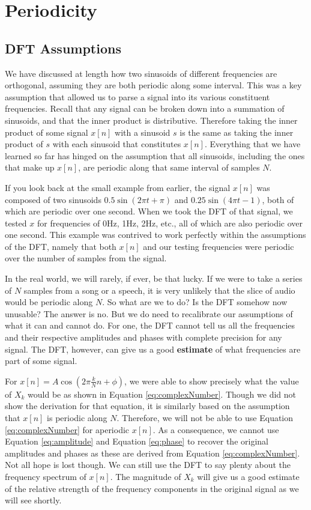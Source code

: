\section*{Periodicity}

\subsection*{DFT Assumptions}

We have discussed at length how two sinusoids of different frequencies are orthogonal, assuming they
are both periodic along some interval.  This was a key assumption that allowed us to parse a signal into 
its various constituent frequencies.  Recall that any signal can be broken down into a summation of sinusoids,
and that the inner product is distributive.  
Therefore taking the inner product of some signal $x[n]$ with
a sinusoid $s$ is the same as taking the inner product of $s$ with each sinusoid that
constitutes $x[n]$.  Everything that we have learned so far has hinged on the assumption that all sinusoids, 
including the ones that make up $x[n]$, are periodic along that same interval of samples $N$.  

If you look back
at the small example from earlier, the signal $x[n]$ was composed of two sinusoids $0.5\sin(2\pi t + \pi)$
and $0.25\sin(4\pi t - 1)$, both of which are periodic over one second.  When we took the DFT of that signal,
we tested $x$ for frequencies of 0Hz, 1Hz, 2Hz, etc., all of which are also periodic over one second.  This
example was contrived to work perfectly within the assumptions of the DFT, namely that both $x[n]$ and
our testing frequencies were periodic over the number of samples from the signal.  

In the real world, we will rarely, if ever, be that lucky.  If we were to take a series of $N$ samples from a song
or a speech, it is very unlikely that the slice of audio would be periodic along $N$.  So what are we to do?  Is the
DFT somehow now unusable?  The answer is no.  But we do need to recalibrate our assumptions of what
it can and cannot do.  For one, the DFT cannot tell us all the frequencies
and their respective amplitudes and phases with complete precision for any signal.  
The DFT, however, can give us a good \textbf{estimate} of what frequencies are part of some signal.

For $x[n] = A\cos(2 \pi \frac{k}{N} n + \phi)$, we were able to show precisely what the value of
$X_k$ would be as shown in Equation \ref{eq:complexNumber}.  Though we did not show the derivation for 
that equation, it is similarly
based on the assumption that $x[n]$ is periodic along $N$.  Therefore,
we will not be able to use Equation \ref{eq:complexNumber} for aperiodic $x[n]$.  As a consequence, we 
cannot use Equation \ref{eq:amplitude} and 
Equation \ref{eq:phase} to recover the original amplitudes and phases
 as these are derived from Equation \ref{eq:complexNumber}.  Not all hope is lost
though.  We can still use the DFT to say plenty about the frequency spectrum of $x[n]$.  The magnitude of 
$X_k$ will give us a good estimate of the relative strength of the frequency components in the original 
signal as we will see shortly.  

